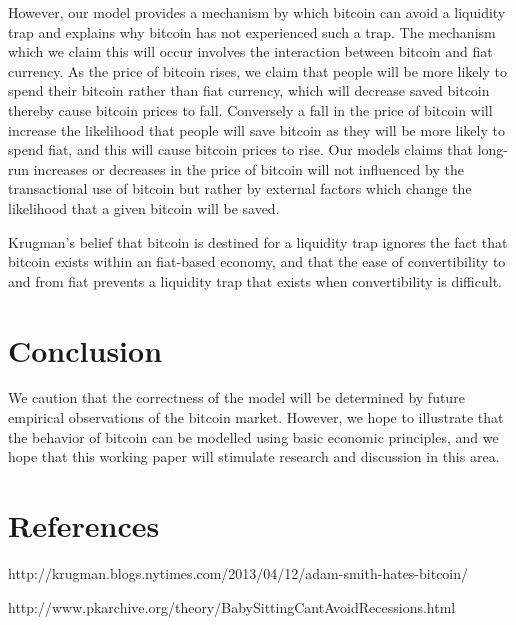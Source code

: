However, our model provides a mechanism by which bitcoin can avoid a
liquidity trap and explains why bitcoin has not experienced such a
trap.  The mechanism which we claim this will occur involves the
interaction between bitcoin and fiat currency.  As the price of
bitcoin rises, we claim that people will be more likely to spend their
bitcoin rather than fiat currency, which will decrease saved bitcoin
thereby cause bitcoin prices to fall.  Conversely a fall in the price
of bitcoin will increase the likelihood that people will save bitcoin
as they will be more likely to spend fiat, and this will cause bitcoin
prices to rise.  Our models claims that long-run increases or
decreases in the price of bitcoin will not influenced by the
transactional use of bitcoin but rather by external factors which
change the likelihood that a given bitcoin will be saved.

Krugman's belief that bitcoin is destined for a liquidity trap ignores
the fact that bitcoin exists within an fiat-based economy, and that
the ease of convertibility to and from fiat prevents a liquidity trap
that exists when convertibility is difficult.

\section{Conclusion}
We caution that the correctness of the model will be determined by
future empirical observations of the bitcoin market.  However, we hope
to illustrate that the behavior of bitcoin can be modelled using basic
economic principles, and we hope that this working paper will
stimulate research and discussion in this area.

\section{References}
http://krugman.blogs.nytimes.com/2013/04/12/adam-smith-hates-bitcoin/

http://www.pkarchive.org/theory/BabySittingCantAvoidRecessions.html



